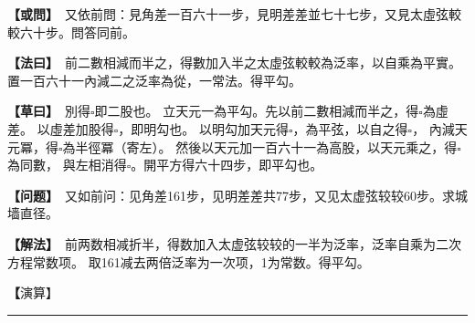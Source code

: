 \documentclass[11pt,a4paper]{article}
\let\origsquare\square
\renewcommand{\square}{\ensuremath{\origsquare}}%
\newcommand{\longline}{\noindent\rule{\textwidth}{0.4pt}}
\newcommand{\clOWEN}[1]{%
  \par\vspace{0.3em}%
  \noindent\textcolor{problemcolor}{\textbf{【或問】}}\,{\tradfont #1}\par\nopagebreak%
}
\newcommand{\mdOWEN}[1]{%
  \par\vspace{0.3em}%
  \noindent\textcolor{problemcolor}{\textbf{【问题】}}\,{\modfont #1}\par\nopagebreak%
}
\newcommand{\clFAYUE}[1]{%
  \par\noindent\textcolor{methodcolor}{\textbf{【法曰】}}\,{\tradfont #1}\par\nopagebreak%
}
\newcommand{\mdFAYUE}[1]{%
  \par\noindent\textcolor{methodcolor}{\textbf{【解法】}}\,{\modfont #1}\par\nopagebreak%
}
\newcommand{\clTSAOYUE}[1]{%
  \par\noindent\textcolor{workcolor}{\textbf{【草曰】}}\,{\tradfont #1}\par%
}
\newcommand{\mdTSAOYUE}[1]{%
  \par\noindent\textcolor{workcolor}{\textbf【演算】}}\,{\modfont #1}\par%
\begin{document}
\begin{paracol}{2}

\begin{leftcolumn}
\clOWEN{%
又依前問：見角差一百六十一步，見明差差並七十七步，又見太虛弦較較六十步。問答同前。}

\clFAYUE{%
前二數相減而半之，得數加入半之太虛弦較較為泛率，以自乘為平實。
置一百六十一內減二之泛率為從，一常法。得平勾。}

\clTSAOYUE{%
別得$\square$即二股也。
立天元一為平勾。先以前二數相減而半之，得$\square$為虛差。
以虛差加股得$\square$，即明勾也。
以明勾加天元得$\square$，為平弦，以自之得$\square$，
內減天元冪，得$\square$為半徑冪（寄左）。
然後以天元加一百六十一為高股，以天元乘之，得$\square$為同數，
與左相消得$\square$。開平方得六十四步，即平勾也。}
\end{leftcolumn}

\switchcolumn

\begin{rightcolumn}
\mdOWEN{%
又如前问：见角差161步，见明差差共77步，又见太虚弦较较60步。求城墙直径。}

\mdFAYUE{%
前两数相减折半，得数加入太虚弦较较的一半为泛率，泛率自乘为二次方程常数项。
取161减去两倍泛率为一次项，1为常数。得平勾。}

\mdTSAOYUE{%
辨识得：$\square$即二股。
设天元一为平勾。先以前两数相减折半得$\square$为虚差。
以虚差加股得$\square$即明勾。
以明勾加天元得$\square$为平弦，自乘得$\square$，
减去天元冪得$\square$为半半径冪（寄左）。
然后以天元加161为高股，以天元乘之得$\square$为同数，
与左式相消得$\square$。开平方得64步，即平勾。}
\end{rightcolumn}

\end{paracol}

\vspace{0.3cm}
\begin{center}\longline\end{center}
\end{document}
